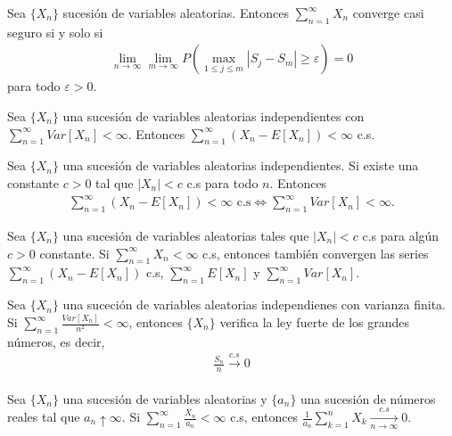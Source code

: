 \begin{lema}
    Sea $\{X_n\}$ sucesión de variables aleatorias. Entonces $\sum_{n=1}^{\infty} X_n$ converge casi seguro si y solo si
    \begin{align*}
        \lim_{n \to \infty} \lim_{m \to \infty} P\left( \max_{1 \leq j \leq m} |S_j - S_m| \ge \varepsilon \right) = 0
    \end{align*}
    para todo $\varepsilon > 0$.
\end{lema}

\begin{teo}
    Sea $\{X_n\}$ una sucesión de variables aleatorias independientes con $\sum_{n=1}^{\infty} Var[X_n] < \infty$. Entonces $\sum_{n=1}^{\infty}(X_n - E[X_n]) < \infty$ c.s.
\end{teo}

\begin{teo}
    Sea $\{X_n\}$ una sucesión de variables aleatorias independientes. Si existe una constante $c>0$ tal que $|X_n| < c$ c.s para todo $n$. Entonces
    \begin{align*}
        \sum_{n=1}^{\infty}(X_n - E[X_n]) < \infty \text{ c.s} \Longleftrightarrow \sum_{n=1}^{\infty} Var[X_n] < \infty.
    \end{align*}
\end{teo}

\begin{cor}
    Sea $\{X_n\}$ una sucesión de variables aleatorias tales que $|X_n| < c$ c.s para algún $c>0$ constante. Si $\sum_{n=1}^{\infty} X_n < \infty$ c.s, entonces también convergen las series $\sum_{n=1}^{\infty}(X_n - E[X_n])$ c.s, $\sum_{n=1}^{\infty}E[X_n]$ y $\sum_{n=1}^{\infty} Var[X_n]$.
\end{cor}

\begin{teo}
    Sea $\{X_n\}$ una suceción de variables aleatorias independienes con varianza finita. Si $\sum_{n=1}^{\infty} \frac{Var[X_n]}{n^2} < \infty$, entonces $\{X_n\}$ verifica la ley fuerte de los grandes números, es decir,
    \begin{align*}
        \frac{S_n}{n} \xrightarrow[]{c.s} 0
    \end{align*}
\end{teo}

\begin{lema}[Kronecker]
    Sea $\{X_n\}$ una sucesión de variables aleatorias y $\{a_n\}$ una sucesión de números reales tal que $a_n \uparrow \infty$. Si $\sum_{n=1}^{\infty} \frac{X_n}{a_n} < \infty$ c.s, entonces $\frac{1}{a_n} \sum_{k=1}^{n} X_k \xrightarrow[n\to \infty]{c.s} 0$.
\end{lema}

